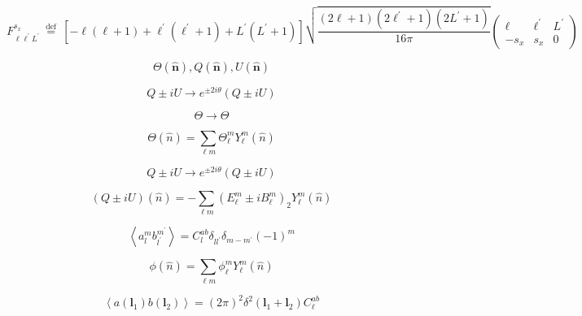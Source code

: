 \documentclass[12pt, notitlepage, onecolumn, amsmath, amssymb, aps]{revtex4-1}
\title{}
\begin{document}
\begin{equation}
  F_{\ell \ell^{\prime} L^{\prime}}^{s_{x}} \stackrel{\text { def }}{=}\left[-\ell\left(\ell+1\right)+\ell^{\prime}\left(\ell^{\prime}+1\right)+L^{\prime}\left(L^{\prime}+1\right)\right] \sqrt{\frac{\left(2 \ell+1\right)\left(2 \ell^{\prime}+1\right)\left(2 L^{\prime}+1\right)}{16 \pi}}\left(\begin{array}{ccc}{\ell} & {\ell^{\prime}} & {L^{\prime}} \\ {-s_{x}} & {s_{x}} & {0}\end{array}\right)
\end{equation}

\begin{equation}
  \Theta(\hat{\mathbf{n}}), Q(\hat{\mathbf{n}}), U(\hat{\mathbf{n}})
\end{equation}

\begin{equation}
  Q \pm i U \rightarrow e^{\pm 2 i \theta}(Q \pm i U)
\end{equation}

\begin{equation}
  \Theta \rightarrow \Theta
\end{equation}

\begin{equation}
  \Theta(\hat{n})=\sum_{\ell m}\Theta_{\ell}^{m} Y_{\ell}^{m}(\hat{n})
\end{equation}

\begin{equation}
  Q \pm i U \rightarrow e^{\pm 2 i \theta}(Q \pm i U)
\end{equation}

\begin{equation}
  (Q \pm i U)(\hat{n})=-\sum_{\ell m}\left(E_{\ell}^{m} \pm i B_{\ell}^{m}\right)_{2} Y_{\ell}^{m}(\hat{n})
\end{equation}

\begin{equation}
  \left\langle a_{l}^{m} b_{l^{\prime}}^{m^{\prime}}\right\rangle=C_{l}^{a b} \delta_{l l^{\prime}} \delta_{m-m^{\prime}}(-1)^{m}
\end{equation}

\begin{equation}
   \phi (\hat{n})=\sum_{\ell m}\phi_{\ell}^{m}  Y_{\ell}^{m}(\hat{n})
 \end{equation}

\begin{equation}
   \left\langle a\left(\mathbf{l}_{1}\right) b\left(\mathbf{l}_{2}\right)\right\rangle=(2 \pi)^{2} \delta^{2}\left(\mathbf{l}_{1}+\mathbf{l}_{2}\right) C_{\ell}^{ab}
\end{equation}
\end{document}
